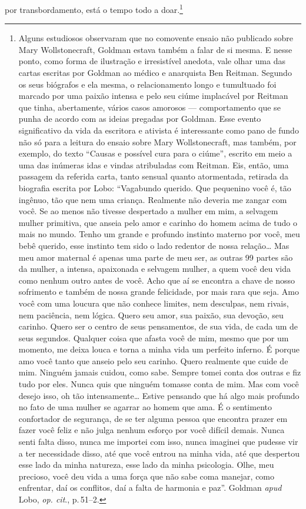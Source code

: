 por transbordamento, está o tempo todo a doar.\footnote{Alguns
  estudiosos observaram que no comovente ensaio não publicado sobre Mary
  Wollstonecraft, Goldman estava também a falar de si
  mesma. E nesse ponto, como forma de ilustração e irresistível anedota,
  vale olhar uma das cartas escritas por Goldman ao médico e
  anarquista Ben Reitman. Segundo os seus biógrafos e ela mesma, o
  relacionamento longo e tumultuado foi marcado por uma paixão intensa
  e pelo seu ciúme implacável por Reitman que
  tinha, abertamente, vários casos amorosos --- comportamento que se
  punha de acordo com as ideias pregadas por Goldman. Esse evento
  significativo da vida da escritora e ativista é 
  interessante como pano de fundo não só para a leitura do
  ensaio sobre Mary Wollstonecraft, mas também, por exemplo, do texto
  ``Causas e possível cura para o ciúme'', escrito em meio a
  uma das inúmeras idas e vindas atribuladas com Reitman. Eis, então,
  uma passagem da referida carta, tanto sensual quanto atormentada,
  retirada da biografia escrita por Lobo: ``Vagabundo querido. Que
  pequenino você é, tão ingênuo, tão que nem uma criança. Realmente não
  deveria me zangar com você. Se ao menos não tivesse despertado a
  mulher em mim, a selvagem mulher primitiva, que anseia pelo amor e
  carinho do homem acima de tudo o mais no mundo. Tenho um grande e
  profundo instinto materno por você, meu bebê querido, esse instinto
  tem sido o lado redentor de nossa relação\ldots{} Mas meu amor maternal é
  apenas uma parte de meu ser, as outras 99 partes são da mulher, a
  intensa, apaixonada e selvagem mulher, a quem você deu vida como
  nenhum outro antes de você. Acho que aí se encontra a chave de nosso
  sofrimento e também de nossa grande felicidade, por mais rara que
  seja. Amo você com uma loucura que não conhece limites, nem desculpas,
  nem rivais, nem paciência, nem lógica. Quero seu amor, sua paixão, sua
  devoção, seu carinho. Quero ser o centro de seus pensamentos, de sua
  vida, de cada um de seus segundos. Qualquer coisa que afasta você de
  mim, mesmo que por um momento, me deixa louca e torna a minha vida um
  perfeito inferno. É porque amo você tanto que anseio pelo seu carinho.
  Quero realmente que cuide de mim. Ninguém jamais cuidou, como sabe.
  Sempre tomei conta dos outras e fiz tudo por eles. Nunca quis que
  ninguém tomasse conta de mim. Mas com você desejo isso, oh tão
  intensamente\ldots{} Estive pensando que há algo mais profundo no fato de
  uma mulher se agarrar ao homem que ama. É o sentimento confortador de
  segurança, de se ter alguma pessoa que encontra prazer em fazer você
  feliz e não julga nenhum esforço por você difícil demais. Nunca senti
  falta disso, nunca me importei com isso, nunca imaginei que pudesse
  vir a ter necessidade disso, até que você entrou na minha vida, até
  que despertou esse lado da minha natureza, esse lado da minha
  psicologia. Olhe, meu precioso, você deu vida a uma força que não sabe
  coma manejar, como enfrentar, daí os conflitos, daí a falta de
  harmonia e paz''. Goldman \textit{apud} Lobo, \textit{op. cit}., p.\,51--2.}

